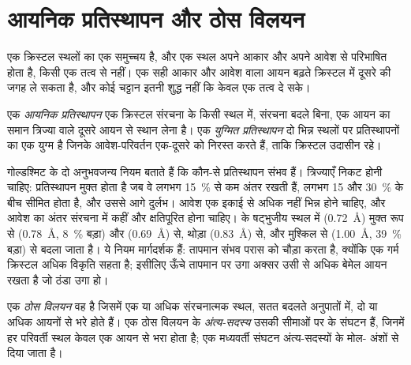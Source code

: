 \section{आयनिक प्रतिस्थापन और ठोस विलयन}

एक क्रिस्टल स्थलों का एक समुच्चय है, और एक स्थल अपने आकार और अपने आवेश से परिभाषित होता है, किसी एक तत्व से नहीं।
एक सही आकार और आवेश वाला आयन बढ़ते क्रिस्टल में दूसरे की जगह ले सकता है, और कोई चट्टान इतनी शुद्ध नहीं कि
केवल एक तत्व दे सके।

\begin{definition}[आयनिक प्रतिस्थापन, युग्मित प्रतिस्थापन]\label{def:b1:rock-forming-minerals:substitution}
एक \emph{आयनिक प्रतिस्थापन} एक क्रिस्टल संरचना के किसी स्थल में, संरचना बदले बिना, एक
आयन का समान त्रिज्या वाले दूसरे आयन से स्थान लेना है। एक \emph{युग्मित
प्रतिस्थापन} दो भिन्न स्थलों पर प्रतिस्थापनों का एक युग्म है जिनके आवेश-परिवर्तन एक-दूसरे
को निरस्त करते हैं, ताकि क्रिस्टल उदासीन रहे।
\end{definition}

गोल्डश्मिट के दो अनुभवजन्य नियम बताते हैं कि कौन-से प्रतिस्थापन संभव हैं। त्रिज्याएँ निकट होनी चाहिए: प्रतिस्थापन
मुक्त होता है जब वे लगभग \qty{15}{\percent} से कम अंतर रखती हैं, लगभग 15 और \qty{30}{\percent} के बीच सीमित होता है,
और उससे आगे दुर्लभ। आवेश एक इकाई से अधिक नहीं भिन्न होने चाहिए, और आवेश का अंतर संरचना में कहीं और क्षतिपूरित
होना चाहिए।  के षट्भुजीय स्थल में  (\qty{0.72}{\angstrom}) मुक्त रूप से 
(\qty{0.78}{\angstrom}, \qty{8}{\percent} बड़ा) और  (\qty{0.69}{\angstrom}) से, थोड़ा 
(\qty{0.83}{\angstrom}) से, और मुश्किल से  (\qty{1.00}{\angstrom}, \qty{39}{\percent} बड़ा) से बदला जाता है।
ये नियम मार्गदर्शक हैं: तापमान संभव परास को चौड़ा करता है, क्योंकि एक गर्म क्रिस्टल अधिक विकृति सहता है; इसीलिए
ऊँचे तापमान पर उगा  अक्सर उसी  से अधिक बेमेल आयन रखता है जो ठंडा उगा हो।

\begin{definition}\label{def:b1:rock-forming-minerals:solid-solution}
एक \emph{ठोस विलयन} वह  है जिसमें एक या अधिक संरचनात्मक स्थल, सतत बदलते अनुपातों
में, दो या अधिक आयनों से भरे होते हैं। एक ठोस विलयन के \emph{अंत्य-सदस्य} उसकी सीमाओं पर के
संघटन हैं, जिनमें हर परिवर्ती स्थल केवल एक आयन से भरा होता है; एक मध्यवर्ती संघटन अंत्य-सदस्यों के मोल-
अंशों से दिया जाता है।
\end{definition}

